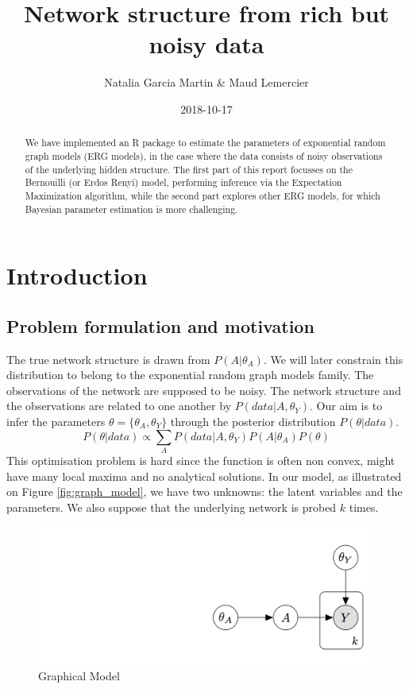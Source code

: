 \documentclass[]{article}
\title{Network structure from rich but noisy data}
\author{Natalia Garcia Martin \& Maud Lemercier}
\date{2018-10-17}
\begin{document}
\maketitle
\begin{abstract}
We have implemented an R package to estimate the parameters of
exponential random graph models (ERG models), in the case where the data
consists of noisy observations of the underlying hidden structure. The
first part of this report focusses on the Bernouilli (or Erdos Renyi)
model, performing inference via the Expectation Maximization algorithm,
while the second part explores other ERG models, for which Bayesian
parameter estimation is more challenging.
\end{abstract}

\hypertarget{introduction}{%
\section{Introduction}\label{introduction}}

\hypertarget{problem-formulation-and-motivation}{%
\subsection{Problem formulation and
motivation}\label{problem-formulation-and-motivation}}

The true network structure is drawn from \(P(A|\theta_A)\). We will
later constrain this distribution to belong to the exponential random
graph models family. The observations of the network are supposed to be
noisy. The network structure and the observations are related to one
another by \(P(data|A,\theta_Y)\). Our aim is to infer the parameters
\(\theta=\{\theta_A,\theta_Y\}\) through the posterior distribution
\(P(\theta|data)\).
\[P(\theta|data)\propto \sum_AP(data|A,\theta_Y)P(A|\theta_A)P(\theta)\]
This optimisation problem is hard since the function is often non
convex, might have many local maxima and no analytical solutions. In our
model, as illustrated on Figure \ref{fig:graph_model}, we have two
unknowns: the latent variables and the parameters. We also suppose that
the underlying network is probed \(k\) times.

\begin{figure}[H]
\includegraphics[width=0.65\linewidth]{GM2} \caption{\label{fig:graph_model}Graphical Model}\label{fig:pressure}
\end{figure}
\end{document}
